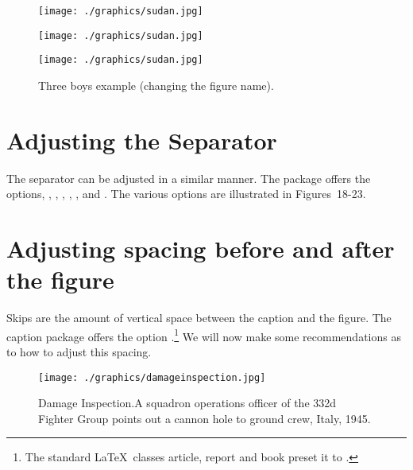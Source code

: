 \begin{teXXX}
\captionsetup{name=Figure.}
\end{teXXX}


\begin{figure*}[h]
\begin{commands}[]{}
\captionsetup{skip=3pt}
\captionsetup{font=small}
\captionsetup{name=Fig}
\captionsetup{labelfont=bf,textfont=it, format=plain}
\RaggedRight
\centering 
\begin{minipage}[t]{90pt}
 \texttt{[image: ./graphics/sudan.jpg]}
 \caption{\acaption }
\end{minipage}
\captionsetup{name=Figure}
\begin{minipage}[t]{90pt}
 \texttt{[image: ./graphics/sudan.jpg]}
 \caption{\acaption }
\end{minipage}
\captionsetup{name=Fig,labelsep=space}
\begin{minipage}[t]{90pt}
 \texttt{[image: ./graphics/sudan.jpg]}
 \caption{\acaption }
\end{minipage}
 \caption{Three boys example (changing the figure name).}
 \end{commands}
\end{figure*}


\section{Adjusting the Separator}


The separator can be adjusted in a similar manner. The package offers the options, , , , , ,  and .  The various options are illustrated
in \hbox{Figures~18-23}.


\section{Adjusting spacing before and after the figure}

Skips are the amount of vertical space between the caption and the figure. The caption package offers the option
.\footnote{The standard \LaTeX\ classes article, report and book preset it to .} We will now make some recommendations as to how to adjust this spacing.

\medskip

\begin{figure}[htp]
\everypar{}

\noindent\texttt{[image: ./graphics/damageinspection.jpg]}

\noindent\caption{Damage Inspection.A squadron operations officer of the 332d Fighter Group points out a cannon hole to ground crew, Italy, 1945.}\par
\end{figure}

